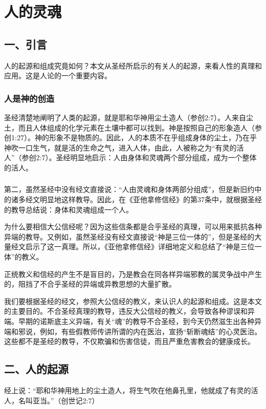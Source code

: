 \chapter{人的灵魂}

\section{一、引言}
人的起源和组成究竟如何？本文从圣经所启示的有关人的起源，来看人性的真理和应用。这是人论的一个重要内容。

\subsection{人是神的创造}
圣经清楚地阐明了人类的起源，就是耶和华神用尘土造人（参创2:7）。人来自尘土，而且人体组成的化学元素在土壤中都可以找到。神是按照自己的形象造人（参创1:27）。神的形象不是物质的。因此，人的本质不在乎组成身体的尘土，乃在乎神吹一口生气，就是活的生命之气，进入人体，由此，人被称之为“有灵的活人”（参创2:7）。圣经明显地启示：人由身体和灵魂两个部分组成，成为一个整体的活人。

\subsection{}
第二，虽然圣经中没有经文直接说：“人由灵魂和身体两部分组成”，但是新旧约中的诸多经文明显地这样教导。因此，在《亚他拿修信经》的第37条中，就根据圣经的教导总结说：身体和灵魂组成一个人。

为什么要相信大公信经呢？因为这些信条都是合乎圣经的真理，可以用来抵抗各种异端的教导。又例如，虽然圣经没有经文直接说“神是三位一体的”，但是圣经的大量经文启示了这一真理。所以，《亚他拿修信经》详细地定义和总结了“神是三位一体”的教义。

正统教义和信经的产生不是盲目的，乃是教会在同各样异端邪教的属灵争战中产生的，阻挡了不合乎圣经的异端或异教思想的大量扩散。

我们要根据圣经的经文，参照大公信经的教义，来认识人的起源和组成。这是本文的主要目的。不合圣经真理的教导，违反大公信经的教义，会导致各种谬误和异端。早期的诺斯底主义异端，有关“魂”的教导不合圣经，到今天仍然滋生出各种异端和邪说，例如，有些假教师传讲所谓的内在医治，宣扬“斩断魂结”的心灵医治。这些都不是圣经的教导，不仅欺骗和伤害信徒，而且严重危害教会的健康成长。

\section{二、人的起源}
经上说：“耶和华神用地上的尘土造人，将生气吹在他鼻孔里，他就成了有灵的活人，名叫亚当。”（创世记2:7）

